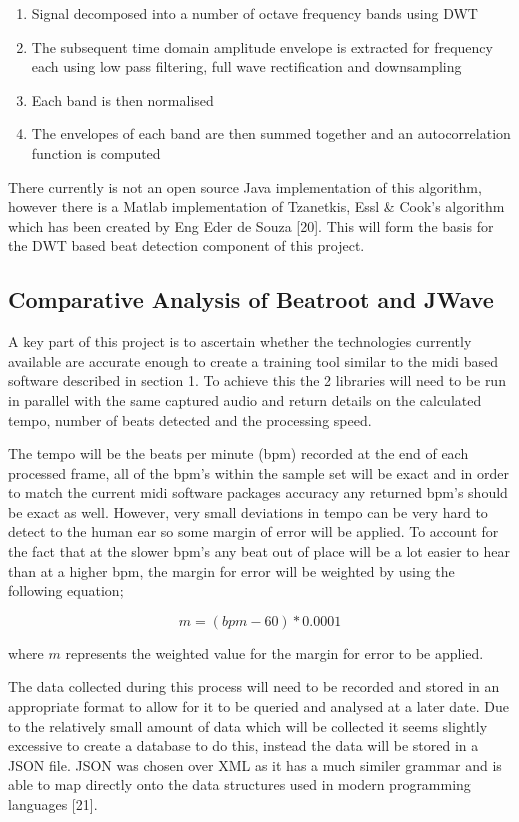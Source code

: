 \documentclass[a4paper, 11pt]{article}
\begin{document}
\begin{enumerate}
\item Signal decomposed into a number of octave frequency bands using DWT
\item The subsequent time domain amplitude envelope is extracted for frequency each using low pass filtering, full wave rectification and downsampling
\item Each band is then normalised
\item The envelopes of each band are then summed together and an autocorrelation function is computed
\end{enumerate}

There currently is not an open source Java implementation of this algorithm, however there is a Matlab implementation of Tzanetkis, Essl \& Cook's algorithm which has been created by Eng Eder de Souza [20]. This will form the basis for the DWT based beat detection component of this project.

\subsection{Comparative Analysis of Beatroot and JWave}
A key part of this project is to ascertain whether the technologies currently available are accurate enough to create a training tool similar to the midi based software described in section 1. To achieve this the 2 libraries will need to be run in parallel with the same captured audio and return details on the calculated tempo, number of beats detected and the processing speed. 

The tempo will be the beats per minute (bpm) recorded at the end of each processed frame, all of the bpm's within the sample set will be exact and in order to match the current midi software packages accuracy any returned bpm's should be exact as well. However, very small deviations in tempo can be very hard to detect to the human ear so some margin of error will be applied. To account for the fact that at the slower bpm's any beat out of place will be a lot easier to hear than at a higher bpm, the margin for error will be weighted by using the following equation;

\[ m = (bpm - 60) * 0.0001\]
\begin{flushleft}
where \(m\) represents the weighted value for the margin for error to be applied.
\end{flushleft}
The data collected during this process will need to be recorded and stored in an appropriate format to allow for it to be queried and analysed at a later date. Due to the relatively small amount of data which will be collected it seems slightly excessive to create a database to do this, instead the data will be stored in a JSON file. JSON was chosen over XML as it has a much similer grammar and is able to map directly onto the data structures used in modern programming languages [21].
\end{document}
